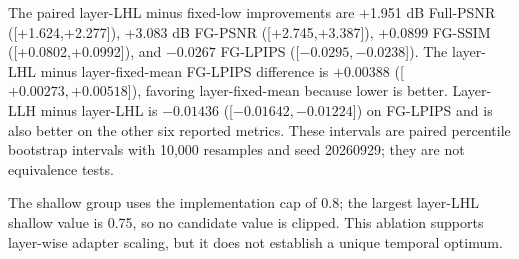 \documentclass[10pt]{article}
\begin{document}
\begin{table}[h]
\centering\scriptsize
\caption{Shared-input development ablation. Means are over 72 object-seed
pairs. Lower is better for LPIPS.}
\end{table}

The paired layer-LHL minus fixed-low improvements are +1.951 dB Full-PSNR
([+1.624,+2.277]), +3.083 dB FG-PSNR ([+2.745,+3.387]), +0.0899 FG-SSIM
([+0.0802,+0.0992]), and $-0.0267$ FG-LPIPS
([$-0.0295,-0.0238$]). The layer-LHL minus layer-fixed-mean FG-LPIPS
difference is $+0.00388$ ([$+0.00273,+0.00518$]), favoring layer-fixed-mean
because lower is better. Layer-LLH minus layer-LHL is $-0.01436$
([$-0.01642,-0.01224$]) on FG-LPIPS and is also better on the other six
reported metrics. These intervals are paired percentile bootstrap intervals
with 10,000 resamples and seed 20260929; they are not equivalence tests.

The shallow group uses the implementation cap of 0.8; the largest layer-LHL
shallow value is 0.75, so no candidate value is clipped. This ablation supports
layer-wise adapter scaling, but it does not establish a unique temporal optimum.
\end{document}
